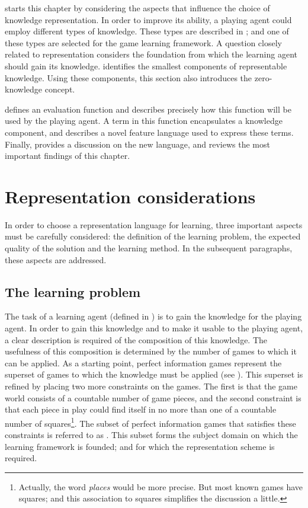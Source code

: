  starts this chapter by considering the aspects that influence the choice of knowledge representation.  In order to improve its ability, a playing agent could employ different types of knowledge. These types are described in ; and one of these types are selected for the game learning framework.  A question closely related to representation considers the foundation from which the learning agent should gain its knowledge.  identifies the smallest components of representable knowledge. Using these components, this section also introduces the zero-knowledge concept.      

 defines an evaluation function and describes precisely how this function will be used by the playing agent. A term in this function encapsulates a knowledge component, and    describes a novel feature language used to express these terms.  Finally,  provides a discussion on the new language, and reviews the most important findings of this chapter.


\section{Representation considerations}
\label{sec:knowledge-representation}
In order to choose a representation language for learning, three important  aspects must be carefully considered: the definition of the learning problem, the expected quality of the solution and the learning method. In the subsequent paragraphs, these aspects are addressed.

\subsection*{The learning problem}
The task of a learning agent (defined in ) is to gain the knowledge for the playing agent. In order to gain this knowledge and to make it usable to the playing agent, a clear description is required of the composition of this knowledge.  The usefulness of this composition is determined by the number of games to which it can be applied. As a starting point, perfect information games represent the superset of games to which the knowledge must be applied (see ). This superset is refined by placing two more constraints on the games. The first is that the game world consists of a countable number of game pieces, and the second constraint is that each piece in play could find itself in no more than one of a countable number of squares\footnote{Actually, the word {\it places} would be more precise.  But most known games have squares; and this association to squares simplifies the discussion a little.}.  The subset of perfect information games that satisfies these constraints is referred to as .  This subset forms the  subject domain on which the learning framework is founded; and for which the representation scheme is required.          


